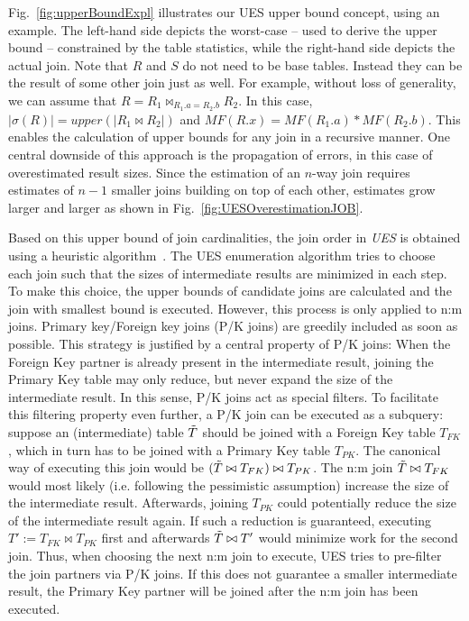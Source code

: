 Fig.~\ref{fig:upperBoundExpl} illustrates our UES upper bound concept, using an example. 
The left-hand side depicts the worst-case -- used to derive the upper bound -- constrained by the table statistics, while the right-hand side depicts the actual join.
Note that $R$ and $S$ do not need to be base tables. 
Instead they can be the result of some other join just as well. 
For example, without loss of generality, we can assume that $R = R_1 \bowtie_{R_1.a = R_2.b} R_2$. 
In this case, $|\sigma(R)| = upper(|R_1 \bowtie R_2|)$ and $MF(R.x) = MF(R_1.a) * MF(R_2.b)$. 
This enables the calculation of upper bounds for any join in a recursive manner. 
One central downside of this approach is the propagation of errors, in this case of overestimated result sizes. 
Since the estimation of an $n$-way join requires estimates of $n-1 $ smaller joins building on top of each other, estimates grow larger and larger as shown in Fig.~\ref{fig:UESOverestimationJOB}.

Based on this upper bound of join cardinalities, the join order in \emph{UES} is obtained using a heuristic algorithm~\cite{hertzschuch-21-ues}.
The UES enumeration algorithm tries to choose each join such that the sizes of intermediate results are minimized in each step. 
To make this choice, the upper bounds of candidate joins are calculated and the join with smallest bound is executed. 
However, this process is only applied to n:m joins. 
Primary key/Foreign key joins (P/K joins) are greedily included as soon as possible. 
This strategy is justified by a central property of P/K joins: When the Foreign Key partner is already present in the intermediate result, joining the Primary Key table may only reduce, but never expand the size of the intermediate result. In this sense, P/K joins act as special filters. 
To facilitate this filtering property even further, a P/K join can be executed as a subquery: suppose an (intermediate) table $\Tilde{T}$ should be joined with a Foreign Key table $T_{FK}$, which in turn has to be joined with a Primary Key table $T_{PK}$. 
The canonical way of executing this join would be $(\Tilde{T} \bowtie T_{FK}) \bowtie T_{PK}$. The n:m join $\Tilde{T} \bowtie T_{FK}$ would most likely (i.e. following the pessimistic assumption) increase the size of the intermediate result. 
Afterwards, joining $T_{PK}$ could potentially reduce the size of the intermediate result again. 
If such a reduction is guaranteed, executing $T' := T_{FK} \bowtie T_{PK}$ first and afterwards $\Tilde{T} \bowtie T'$ would minimize work for the second join. Thus, when choosing the next n:m join to execute, UES tries to pre-filter the join partners via P/K joins. 
If this does not guarantee a smaller intermediate result, the Primary Key partner will be joined after the n:m join has been executed.


